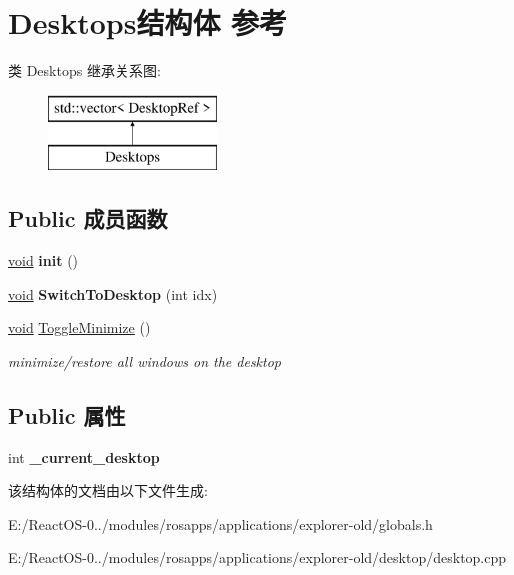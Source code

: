 \hypertarget{struct_desktops}{}\section{Desktops结构体 参考}
\label{struct_desktops}
类 Desktops 继承关系图\+:\begin{figure}[H]
\begin{center}
\leavevmode
\includegraphics[height=2.000000cm]{struct_desktops}
\end{center}
\end{figure}
\subsection*{Public 成员函数}
\begin{DoxyCompactItemize}
\item 
\mbox{\label{struct_desktops_a7b4467c4aa0f7113dd9b9ed6d7c40430}} 
\hyperlink{interfacevoid}{void} {\bfseries init} ()
\item 
\mbox{\label{struct_desktops_a07c2db62475aaa511023584c506b3a2b}} 
\hyperlink{interfacevoid}{void} {\bfseries Switch\+To\+Desktop} (int idx)
\item 
\mbox{\label{struct_desktops_a38b7b7f2ab5e91be5b3083a7c67e8a7b}} 
\hyperlink{interfacevoid}{void} \hyperlink{struct_desktops_a38b7b7f2ab5e91be5b3083a7c67e8a7b}{Toggle\+Minimize} ()
\begin{DoxyCompactList}\small\item\em minimize/restore all windows on the desktop \end{DoxyCompactList}\end{DoxyCompactItemize}
\subsection*{Public 属性}
\begin{DoxyCompactItemize}
\item 
\mbox{\label{struct_desktops_adf467b5cbd2101a75176dbcbe58558da}} 
int {\bfseries \+\_\+current\+\_\+desktop}
\end{DoxyCompactItemize}


该结构体的文档由以下文件生成\+:\begin{DoxyCompactItemize}
\item 
E\+:/\+React\+O\+S-\/0../modules/rosapps/applications/explorer-\/old/globals.\+h\item 
E\+:/\+React\+O\+S-\/0../modules/rosapps/applications/explorer-\/old/desktop/desktop.\+cpp\end{DoxyCompactItemize}
